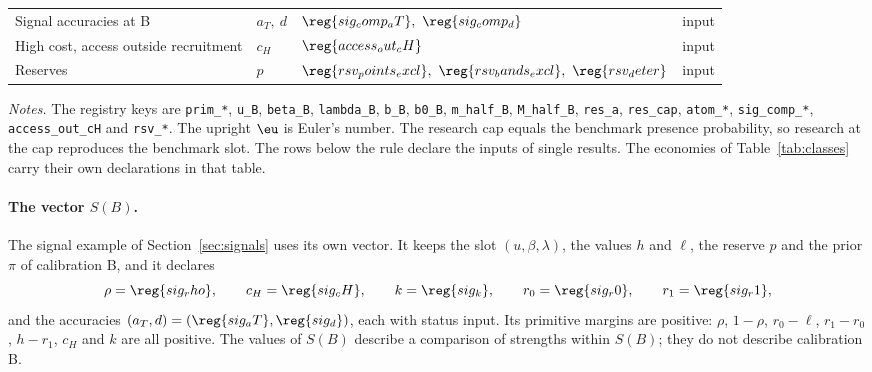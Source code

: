 \begin{table}[ht]
\begin{tabular}{@{}llll@{}}
Signal accuracies at B & \(a_T,\ d\) & \(\reg{sig_comp_aT},\ \reg{sig_comp_d}\) & input\\
High cost, access outside recruitment & \(c_H\) & \(\reg{access_out_cH}\) & input\\
Reserves & \(p\) & \(\reg{rsv_points_excl},\ \reg{rsv_bands_excl},\ \reg{rsv_deter}\) & input\\
\bottomrule
\end{tabular}
\par\medskip
\begin{minipage}{0.92\linewidth}\footnotesize
\textit{Notes.} The registry keys are \texttt{prim\_*}, \texttt{u\_B}, \texttt{beta\_B}, \texttt{lambda\_B},
\texttt{b\_B}, \texttt{b0\_B}, \texttt{m\_half\_B}, \texttt{M\_half\_B}, \texttt{res\_a}, \texttt{res\_cap},
\texttt{atom\_*}, \texttt{sig\_comp\_*}, \texttt{access\_out\_cH} and \texttt{rsv\_*}. The upright \(\eu\) is Euler's
number. The research cap equals the benchmark presence probability, so research at the cap reproduces the benchmark
slot. The rows below the rule declare the inputs of single results. The economies of Table~\ref{tab:classes} carry
their own declarations in that table.
\end{minipage}
\end{table}

\paragraph{The vector \(S(B)\).}
The signal example of Section~\ref{sec:signals} uses its own vector. It keeps the slot \((u,\beta,\lambda)\), the values
\(h\) and \(\ell\), the reserve \(p\) and the prior \(\pi\) of calibration B, and it declares
\[
\rho=\reg{sig_rho},\qquad c_H=\reg{sig_cH},\qquad k=\reg{sig_k},\qquad r_0=\reg{sig_r0},\qquad r_1=\reg{sig_r1},
\]
and the accuracies \((a_T,d)=(\reg{sig_aT},\reg{sig_d})\),
each with status input. Its primitive margins are positive: \(\rho\), \(1-\rho\), \(r_0-\ell\), \(r_1-r_0\), \(h-r_1\),
\(c_H\) and \(k\) are all positive. The values of \(S(B)\) describe a comparison of strengths within \(S(B)\); they do
not describe calibration B.

